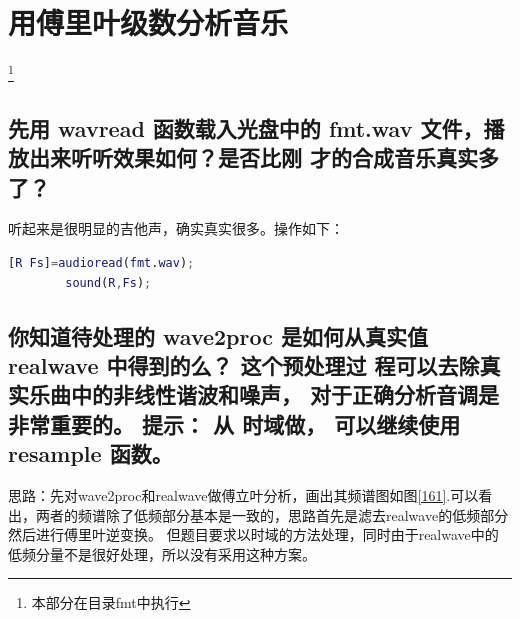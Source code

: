 \documentclass{ctexart}
\begin{document}
        \section{用傅里叶级数分析音乐}\footnote{本部分在目录fmt中执行}
		\setcounter{subsection}{5} 
    \subsection{先用 wavread 函数载入光盘中的 fmt.wav 文件，播放出来听听效果如何？是否比刚
        才的合成音乐真实多了？}

        听起来是很明显的吉他声，确实真实很多。操作如下：
        \begin{lstlisting}[language=matlab]
        [R Fs]=audioread(fmt.wav);
        sound(R,Fs);
        \end{lstlisting}
    \subsection{
            你知道待处理的 wave2proc 是如何从真实值 realwave 中得到的么？ 这个预处理过
            程可以去除真实乐曲中的非线性谐波和噪声， 对于正确分析音调是非常重要的。 提示： 从
        时域做， 可以继续使用 resample 函数。}

        思路：先对wave2proc和realwave做傅立叶分析，画出其频谱图如图\ref{161}.可以看出，两者的频谱除了低频部分基本是一致的，思路首先是滤去realwave的低频部分然后进行傅里叶逆变换。
        但题目要求以时域的方法处理，同时由于realwave中的低频分量不是很好处理，所以没有采用这种方案。
\end{document}

